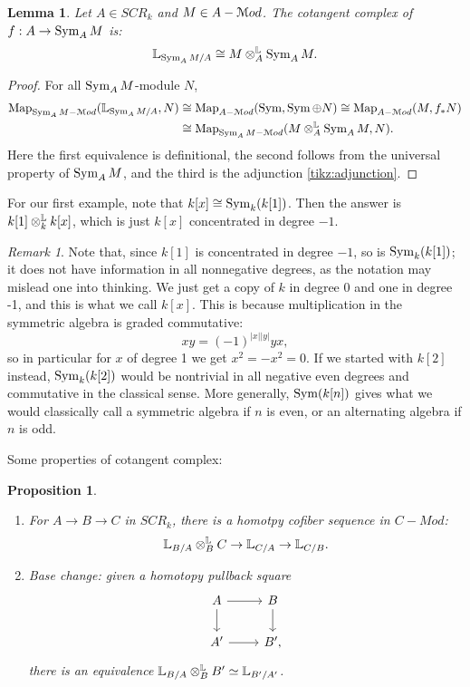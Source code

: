 \documentclass[10pt,a4paper,reqno,oneside]{book} %
\theoremstyle{plain}
\newtheorem{lem}[thm]{Lemma}
\newtheorem{prop}[thm]{Proposition}
\theoremstyle{definition}
\theoremstyle{remark}
\newtheorem{rem}[thm]{Remark}
\numberwithin{equation}{section}
\begin{document}
\begin{lem}
Let $A \in SCR_k$ and $M \in A-\mathcal M od$. The cotangent complex of $f: A \to \operatorname{Sym}_A M$ is:
\[	\mathbb L_{\operatorname{Sym}_A M /A}\cong M \otimes^{\mathbb L}_A \operatorname{Sym}_A M .	\]
\end{lem}
\begin{proof}
For all $\operatorname{Sym}_A M$-module $N$,
\begin{align*}
	\operatorname{Map}_{\operatorname{Sym}_A M -\mathcal M od}(\mathbb L_{\operatorname{Sym}_A M/A}, N) &\cong \operatorname{Map}_{A-\mathcal M od}(\operatorname{Sym}, \operatorname{Sym}\oplus N ) \cong \operatorname{Map}_{A-\mathcal M od}(M, f_* N) \\
&\cong \operatorname{Map}_{\operatorname{Sym}_A M - \mathcal M od}(M \otimes^{\mathbb L}_A \operatorname{Sym}_A M ,N).
\end{align*}
Here the first equivalence is definitional, the second follows from the universal property of $\operatorname{Sym}_A M$, and the third is
the adjunction \ref{tikz:adjunction}.
\end{proof}

For our first example, note that $k[x] \cong \operatorname{Sym}_k(k[1])$. Then the answer is $k[1] \otimes^{\mathbb L}_k k[x]$, which is just 
$k[x]$ concentrated in degree $-1$.

\begin{rem}
\label{rem:degree_convention}
Note that, since $k[1]$ is concentrated in degree $-1$, so is $\operatorname{Sym}_k(k[1])$; it does not have information in all 
nonnegative degrees, as the notation may mislead one into thinking. We just get a copy of $k$ in degree 0 and one
in degree -1,
and this is what we call $k[x]$. This is because multiplication in the symmetric algebra is graded commutative:
\[	x y = (-1)^{|x||y|} yx,	\]
so in particular for $x$ of degree 1 we get $x^2 = -x^2 = 0$. If we started with $k[2]$ instead,
$\operatorname{Sym}_k(k[2])$ would be nontrivial in all negative even degrees and commutative in the classical sense. More generally, 
$\operatorname{Sym}(k[n])$ gives what we would classically
call a symmetric algebra if $n$ is even, or an alternating algebra if $n$ is odd.
\end{rem}

Some properties of cotangent complex:
\begin{prop}
\;
\begin{enumerate}
\item For $A \to B \to C$ in $SCR_k$, there is a homotpy cofiber sequence in $C-Mod$:
\[	\mathbb L_{B/A} \otimes^{\mathbb L}_B C \to \mathbb L_{C/A} \to \mathbb L_{C/B}.	\]
\item Base change: given a homotopy pullback square
\[
\begin{tikzcd}
A\arrow{r}\arrow{d} & B\arrow{d} \\
A'\arrow{r} & B',
\end{tikzcd}
\]
there is an equivalence $\mathbb L_{B/A} \otimes^{\mathbb L}_B B' \simeq \mathbb L_{B'/A'}$.
\end{enumerate}
\end{prop}
\end{document}

